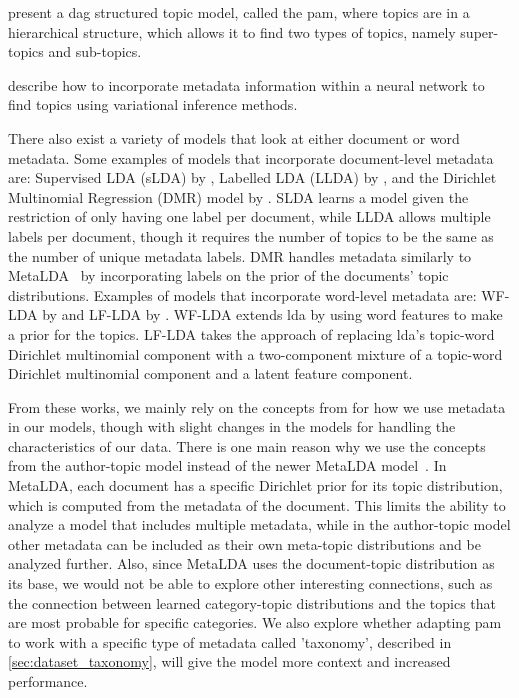 \citet{li2006pachinko} present a \gls{dag} structured topic model, called the \gls{pam}, where topics are in a hierarchical structure, which allows it to find two types of topics, namely super-topics and sub-topics.  

\citet{card2017neural} describe how to incorporate metadata information within a neural network to find topics using variational inference methods.

There also exist a variety of models that look at either document or word metadata.
Some examples of models that incorporate document-level metadata are: Supervised LDA (sLDA) by \citet{blei2010supervised}, Labelled LDA (LLDA) by \citet{llda2009}, and the Dirichlet Multinomial Regression (DMR) model by \citet{mimno2008topic}.
SLDA learns a model given the restriction of only having one label per document, while LLDA allows multiple labels per document, though it requires the number of topics to be the same as the number of unique metadata labels.
DMR handles metadata similarly to MetaLDA~\cite{MetaLDA2017} by incorporating labels on the prior of the documents' topic distributions.
Examples of models that incorporate word-level metadata are: WF-LDA by \citet{wf-lda2010} and LF-LDA by \citet{lf-lda2015}.
WF-LDA extends \gls{lda} by using word features to make a prior for the topics.
LF-LDA takes the approach of replacing \gls{lda}'s topic-word Dirichlet multinomial component with a two-component mixture of a topic-word Dirichlet multinomial component and a latent feature component.

From these works, we mainly rely on the concepts from \citet{author_topic_2012} for how we use metadata in our models, though with slight changes in the models for handling the characteristics of our data.
There is one main reason why we use the concepts from the author-topic model instead of the newer MetaLDA model~\cite{MetaLDA2017}.
In MetaLDA, each document has a specific Dirichlet prior for its topic distribution, which is computed from the metadata of the document.
This limits the ability to analyze a model that includes multiple metadata, while in the author-topic model other metadata can be included as their own meta-topic distributions and be analyzed further.
Also, since MetaLDA uses the document-topic distribution as its base, we would not be able to explore other interesting connections, such as the connection between learned category-topic distributions and the topics that are most probable for specific categories.
We also explore whether adapting \gls{pam}~\cite{li2006pachinko} to work with a specific type of metadata called 'taxonomy', described in \autoref{sec:dataset_taxonomy}, will give the model more context and increased performance.

